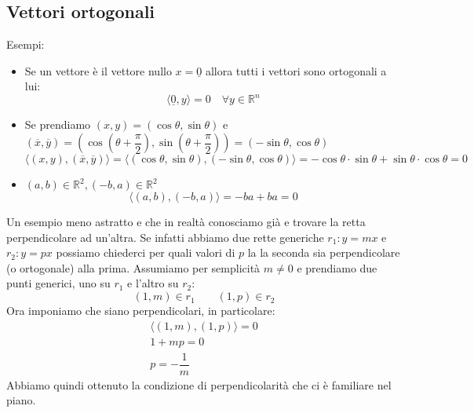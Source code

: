 \subsection{Vettori ortogonali} \label{sec_ortogonalita}
Esempi:
\begin{itemize}
	\item Se un vettore è il vettore nullo $x = \underline{0}$ allora tutti i vettori sono ortogonali a lui:
		\begin{equation*}
			\langle \underline{0}, y \rangle = 0 \quad \forall y \in \mathbb{R}^n
		\end{equation*}
	
	\item Se prendiamo $(x, y) = (\cos{\theta}, \sin{\theta})$ e $(\overline{x}, \overline{y}) = \left(\cos(\theta + \dfrac{\pi}{2}), \sin(\theta + \dfrac{\pi}{2}) \right) = (-\sin{\theta}, \cos{\theta})$
		\begin{equation*}
			\langle (x, y), (\overline{x}, \overline{y}) \rangle = \langle (\cos{\theta}, \sin{\theta}), (-\sin{\theta}, \cos{\theta}) \rangle = -\cos{\theta} \cdot \sin{\theta} + \sin{\theta} \cdot \cos{\theta} = 0
		\end{equation*}
	
	\item $(a, b) \in \mathbb{R}^2, (-b, a ) \in \mathbb{R}^2$
		\begin{equation*}
			\langle (a, b), (-b, a) \rangle = -ba + ba = 0
		\end{equation*}
\end{itemize}
Un esempio meno astratto e che in realtà conosciamo già e trovare la retta perpendicolare ad un'altra. Se infatti abbiamo due rette generiche $r_1: y = mx$ e $r_2: y = px$ possiamo chiederci per quali valori di $p$ la la seconda sia perpendicolare (o ortogonale) alla prima. Assumiamo per semplicità $m \neq 0$ e prendiamo due punti generici, uno su $r_1$ e l'altro su $r_2$:
\begin{equation*}
	(1, m) \in r_1 \qquad (1, p) \in r_2
\end{equation*}
Ora imponiamo che siano perpendicolari, in particolare:
\begin{gather*}
	\langle (1, m), (1, p) \rangle = 0\\[10pt]
	1 + mp = 0 \\[10pt]
	p = -\dfrac{1}{m}
\end{gather*}
Abbiamo quindi ottenuto la condizione di perpendicolarità che ci è familiare nel piano.

